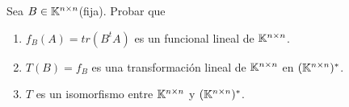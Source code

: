 \item Sea $B\in\mathbb{K}^{n\times n}$(fija). Probar que
    \begin{enumerate}
        \item $f_B(A)=tr(B^tA)$ es un funcional lineal de $\mathbb{K}^{n\times n}$.
            \begin{mdframed}[style=s]
                
            \end{mdframed}
        \item $T(B)=f_B$ es una transformación lineal de $\mathbb{K}^{n\times n}$ en $(\mathbb{K}^{n\times n})^*$.
            \begin{mdframed}[style=s]
                
            \end{mdframed}
        \item $T$ es un isomorfismo entre $\mathbb{K}^{n\times n}$ y $(\mathbb{K}^{n\times n})^*$.
            \begin{mdframed}[style=s]
                
            \end{mdframed}
    \end{enumerate}